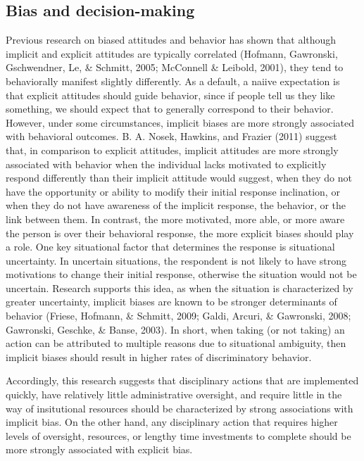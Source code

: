 \documentclass[english,floatsintext,man]{apa6}
\theoremstyle{definition}
\theoremstyle{definition}
\theoremstyle{remark}
\begin{document}
\subsection{Bias and decision-making}\label{bias-and-decision-making}

Previous research on biased attitudes and behavior has shown that
although implicit and explicit attitudes are typically correlated
(Hofmann, Gawronski, Gschwendner, Le, \& Schmitt, 2005; McConnell \&
Leibold, 2001), they tend to behaviorally manifest slightly differently.
As a default, a naiive expectation is that explicit attitudes should
guide behavior, since if people tell us they like something, we should
expect that to generally correspond to their behavior. However, under
some circumstances, implicit biases are more strongly associated with
behavioral outcomes. B. A. Nosek, Hawkins, and Frazier (2011) suggest
that, in comparison to explicit attitudes, implicit attitudes are more
strongly associated with behavior when the individual lacks motivated to
explicitly respond differently than their implicit attitude would
suggest, when they do not have the opportunity or ability to modify
their initial response inclination, or when they do not have awareness
of the implicit response, the behavior, or the link between them. In
contrast, the more motivated, more able, or more aware the person is
over their behavioral response, the more explicit biases should play a
role. One key situational factor that determines the response is
situational uncertainty. In uncertain situations, the respondent is not
likely to have strong motivations to change their initial response,
otherwise the situation would not be uncertain. Research supports this
idea, as when the situation is characterized by greater uncertainty,
implicit biases are known to be stronger determinants of behavior
(Friese, Hofmann, \& Schmitt, 2009; Galdi, Arcuri, \& Gawronski, 2008;
Gawronski, Geschke, \& Banse, 2003). In short, when taking (or not
taking) an action can be attributed to multiple reasons due to
situational ambiguity, then implicit biases should result in higher
rates of discriminatory behavior.

Accordingly, this research suggests that disciplinary actions that are
implemented quickly, have relatively little administrative oversight,
and require little in the way of insitutional resources should be
characterized by strong associations with implicit bias. On the other
hand, any disciplinary action that requires higher levels of oversight,
resources, or lengthy time investments to complete should be more
strongly associated with explicit bias.
\end{document}
